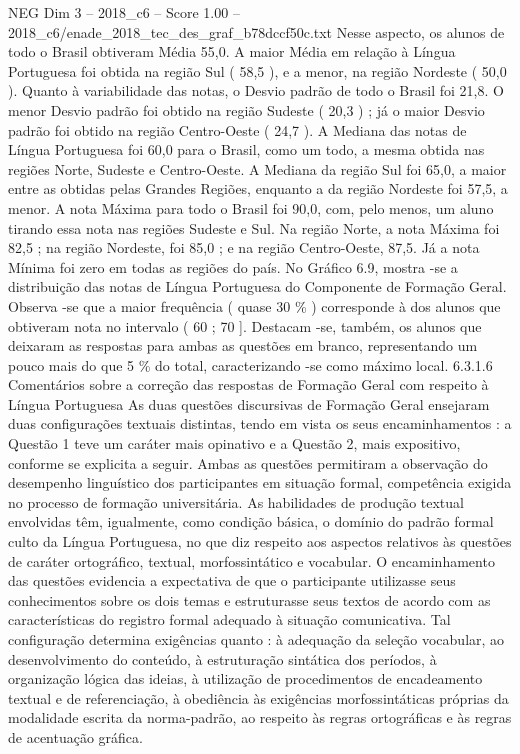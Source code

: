 \begin{textsample}{NEG Dim 3 – 2018\_c6 – Score 1.00 – 2018\_c6/enade\_2018\_tec\_des\_graf\_b78dccf50c.txt}
Nesse aspecto, os alunos de todo o Brasil obtiveram Média 55,0.
A maior Média em relação à Língua Portuguesa foi obtida na região Sul ( 58,5 ), e a menor, na região Nordeste ( 50,0 ).
Quanto à variabilidade das notas, o Desvio padrão de todo o Brasil foi 21,8.
O menor Desvio padrão foi obtido na região Sudeste ( 20,3 ) ; já o maior Desvio padrão foi obtido na região Centro-Oeste ( 24,7 ).
A Mediana das notas de Língua Portuguesa foi 60,0 para o Brasil, como um todo, a mesma obtida nas regiões Norte, Sudeste e Centro-Oeste.
A Mediana da região Sul foi 65,0, a maior entre as obtidas pelas Grandes Regiões, enquanto a da região Nordeste foi 57,5, a menor.
A nota Máxima para todo o Brasil foi 90,0, com, pelo menos, um aluno tirando essa nota nas regiões Sudeste e Sul.
Na região Norte, a nota Máxima foi 82,5 ; na região Nordeste, foi 85,0 ; e na região Centro-Oeste, 87,5.
Já a nota Mínima foi zero em todas as regiões do país.
No Gráfico 6.9, mostra -se a distribuição das notas de Língua Portuguesa do Componente de Formação Geral.
Observa -se que a maior frequência ( quase 30 \% ) corresponde à dos alunos que obtiveram nota no intervalo ( 60 ; 70 ].
Destacam -se, também, os alunos que deixaram as respostas para ambas as questões em branco, representando um pouco mais do que 5 \% do total, caracterizando -se como máximo local. 6.3.1.6 Comentários sobre a correção das respostas de Formação Geral com respeito à Língua Portuguesa As duas questões discursivas de Formação Geral ensejaram duas configurações textuais distintas, tendo em vista os seus encaminhamentos : a Questão 1 teve um caráter mais opinativo e a Questão 2, mais expositivo, conforme se explicita a seguir.
Ambas as questões permitiram a observação do desempenho linguístico dos participantes em situação formal, competência exigida no processo de formação universitária.
As habilidades de produção textual envolvidas têm, igualmente, como condição básica, o domínio do padrão formal culto da Língua Portuguesa, no que diz respeito aos aspectos relativos às questões de caráter ortográfico, textual, morfossintático e vocabular.
O encaminhamento das questões evidencia a expectativa de que o participante utilizasse seus conhecimentos sobre os dois temas e estruturasse seus textos de acordo com as características do registro formal adequado à situação comunicativa.
Tal configuração determina exigências quanto : à adequação da seleção vocabular, ao desenvolvimento do conteúdo, à estruturação sintática dos períodos, à organização lógica das ideias, à utilização de procedimentos de encadeamento textual e de referenciação, à obediência às exigências morfossintáticas próprias da modalidade escrita da norma-padrão, ao respeito às regras ortográficas e às regras de acentuação gráfica.

\end{textsample}
